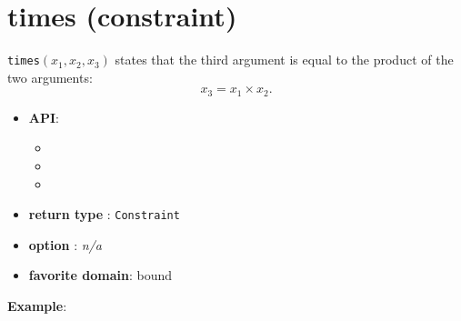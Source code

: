 \label{times}
\hypertarget{times}{}

\section{times (constraint)}\label{times:timesconstraint}\hypertarget{times:timesconstraint}{}
\begin{notedef}
  \texttt{times}$(x_1, x_2, x_3)$ states that the third argument is equal to the product of the two arguments:
$$x_3=x_1\times x_2.$$
\end{notedef}

\begin{itemize}
	\item \textbf{API}:
	\begin{itemize}
		\item {}
		\item {}
		\item {}
	\end{itemize}
	\item \textbf{return type} : \texttt{Constraint}
	\item \textbf{option} : \emph{n/a}
	\item \textbf{favorite domain}: bound
\end{itemize}

\textbf{Example}:
